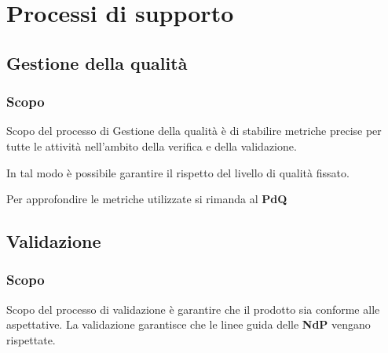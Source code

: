 \chapter{Processi di supporto}




\section{Gestione della qualità}\label{s:qualità}
\subsection{Scopo}
Scopo del processo di Gestione della qualità è di stabilire metriche precise per tutte le attività nell’ambito della verifica e della validazione.

In tal modo è possibile garantire il rispetto del livello
di qualità fissato.

Per approfondire le metriche utilizzate si rimanda al \textbf{PdQ}



\section{Validazione}\label{s:validazione}

\subsection{Scopo} Scopo del processo di validazione è garantire che il prodotto sia conforme alle aspettative. La validazione garantisce che le linee guida delle \textbf{NdP} vengano rispettate.
